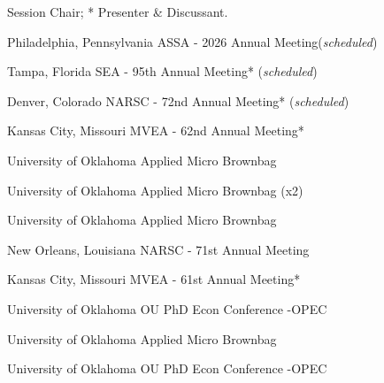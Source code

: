 \textdagger Session Chair; * Presenter \& Discussant.

{%
	Philadelphia, Pennsylvania}
{%
	ASSA - 2026 Annual Meeting\ec (\textit{scheduled})}
{}


{%
	Tampa, Florida}
{%
	SEA - 95th Annual Meeting* (\textit{scheduled})}
{}


{%
	Denver, Colorado}
{%
	NARSC - 72nd Annual Meeting* (\textit{scheduled})}
{}

{%
	Kansas City, Missouri}
{%
	MVEA - 62nd Annual Meeting*}
{}

{%
	University of Oklahoma}
{%
	Applied Micro Brownbag }
{}

{%
	University of Oklahoma}
{%
	Applied Micro Brownbag (x2)}
{}

{%
	University of Oklahoma}
{%
	Applied Micro Brownbag}
{}

{%
	New Orleans, Louisiana}
{%
	NARSC - 71st Annual Meeting\ec}
{}

{%
	Kansas City, Missouri}
{%
	MVEA - 61st Annual Meeting*}
{}


{%
	University of Oklahoma}
{%
	OU PhD Econ Conference -OPEC}
{}

{%
	University of Oklahoma}
{%
	Applied Micro Brownbag}
{}

{%
	University of Oklahoma}
{%
	OU PhD Econ Conference -OPEC}
{}